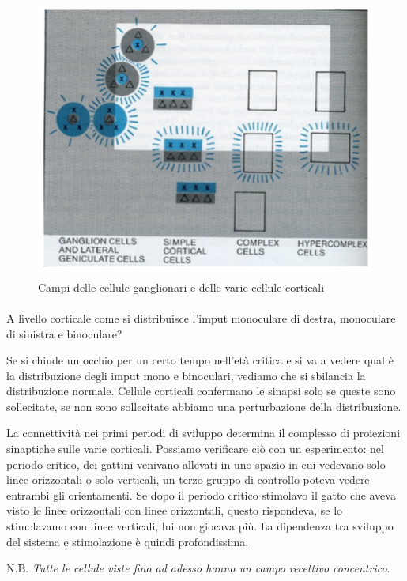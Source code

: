 \documentclass[a4paper,12pt]{article}
\begin{document}
\begin{figure}[H]
\centering
\includegraphics[scale=0.5]{immagine/ganglionari.jpg}
\caption{Campi delle cellule ganglionari e delle varie cellule corticali}
\end{figure}

\paragraph{}
A livello corticale come si distribuisce l'imput monoculare di destra, monoculare di sinistra e binoculare? 

Se si chiude un occhio per un certo tempo nell'età critica e si va a vedere qual è la distribuzione degli imput mono e binoculari, vediamo che si sbilancia la distribuzione normale. Cellule corticali confermano le sinapsi solo se queste sono sollecitate, se non sono sollecitate abbiamo una perturbazione della distribuzione.

La connettività nei primi periodi di sviluppo determina il complesso di proiezioni sinaptiche sulle varie corticali. Possiamo verificare ciò con un esperimento: nel periodo critico, dei gattini venivano allevati in uno spazio in cui vedevano solo linee orizzontali o solo verticali, un terzo gruppo di controllo poteva vedere entrambi gli orientamenti. Se dopo il periodo critico stimolavo il gatto che aveva visto le linee orizzontali con linee orizzontali, questo rispondeva, se lo stimolavamo con linee verticali, lui non giocava più. La dipendenza tra sviluppo del sistema e stimolazione è quindi profondissima. 

N.B. \emph{Tutte le cellule viste fino ad adesso hanno un campo recettivo concentrico}. 
\end{document}
